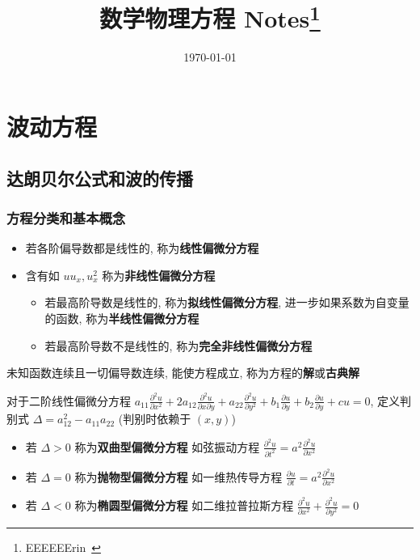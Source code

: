 \documentclass[10pt]{yerbaformat}
\title{数学物理方程 Notes\footnote{EEEEEErin~}}
\date{\today}
\begin{document}
\author{}
\maketitle
\tableofcontents
\footnotesize

\newpage
\section{波动方程}

\subsection{达朗贝尔公式和波的传播}

\subsubsection{方程分类和基本概念}

\begin{itemize}
    \item 若各阶偏导数都是线性的, 称为\textbf{线性偏微分方程}
    \item 含有如 $uu_{x}, u_{x}^{2}$ 称为\textbf{非线性偏微分方程}
          \begin{itemize}
              \item 若最高阶导数是线性的, 称为\textbf{拟线性偏微分方程}, 进一步如果系数为自变量的函数, 称为\textbf{半线性偏微分方程}
              \item 若最高阶导数不是线性的, 称为\textbf{完全非线性偏微分方程}
          \end{itemize}
\end{itemize}

\par 未知函数连续且一切偏导数连续, 能使方程成立, 称为方程的\textbf{解}或\textbf{古典解}

\par 对于二阶线性偏微分方程 $a_{11} \frac{\partial^{2} u}{\partial x^{2}}+2 a_{12} \frac{\partial^{2} u}{\partial x \partial y}+a_{22} \frac{\partial^{2} u}{\partial y^{2}}+b_{1} \frac{\partial u}{\partial y}+b_{2} \frac{\partial u}{\partial y}+c u=0$, 定义判别式 $\Delta=a_{12}^{2}-a_{11} a_{22}$ (判别时依赖于 $(x,y)$)

\begin{itemize}
    \item 若 $\Delta>0$ 称为\textbf{双曲型偏微分方程} 如弦振动方程 $\frac{\partial^{2} u}{\partial t^{2}}=a^{2} \frac{\partial^{2} u}{\partial x^{2}}$
    \item 若 $\Delta=0$ 称为\textbf{抛物型偏微分方程} 如一维热传导方程 $\frac{\partial u}{\partial t}=a^{2} \frac{\partial^{2} u}{\partial x^{2}}$
    \item 若 $\Delta<0$ 称为\textbf{椭圆型偏微分方程} 如二维拉普拉斯方程 $\frac{\partial^{2} u}{\partial x^{2}}+\frac{\partial^{2} u}{\partial y^{2}}=0$
\end{itemize}
\end{document}
